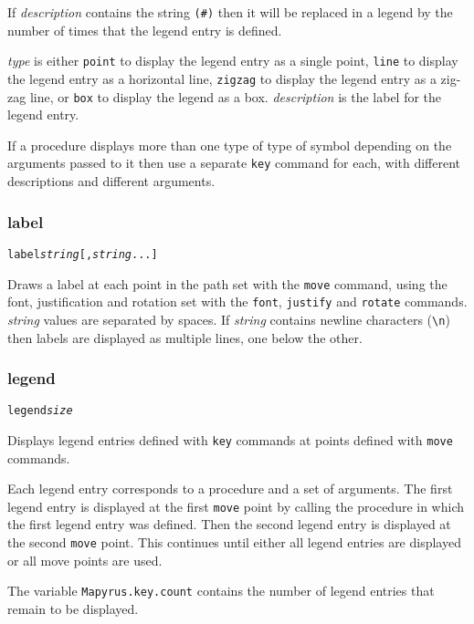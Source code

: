 If \textit{description} contains the string \texttt{(\#)} then it will
be replaced in a legend by the number of times that the legend entry
is defined.

\textit{type} is either
\texttt{point} to display the legend entry as a single point,
\texttt{line} to display the legend entry as a horizontal line,
\texttt{zigzag} to display the legend entry as a zig-zag line,
or
\texttt{box} to display the legend as a box.
\textit{description} is the label for the legend entry.

If a procedure displays more than one type of type of symbol depending
on the arguments passed to it then use a separate
\texttt{key} command for each, with different descriptions
and different arguments.

\subsubsection{label}

\begin{alltt}
label \textit{string} [, \textit{string} ...]
\end{alltt}

Draws a label at each point in the path set with the \texttt{move} command,
using the font, justification and rotation set with the \texttt{font},
\texttt{justify} and \texttt{rotate} commands.  \textit{string} values are
separated by spaces.  If \textit{string} contains newline characters
(\texttt{\textbackslash{}n}) then labels are displayed as multiple lines, one
below the other.

\subsubsection{legend}

\begin{alltt}
legend \textit{size}
\end{alltt}

Displays legend entries defined with
\texttt{key} commands at points defined with
\texttt{move} commands.

Each legend entry corresponds to a procedure and a set of arguments.  The first
legend entry is displayed at the first \texttt{move} point by calling the
procedure in which the first legend entry was defined.  Then the second legend
entry is displayed at the second \texttt{move} point.  This continues until
either all legend entries are displayed or all move points are used.

The variable
\texttt{Mapyrus.key.count}
contains the number of legend entries that remain to be displayed.

